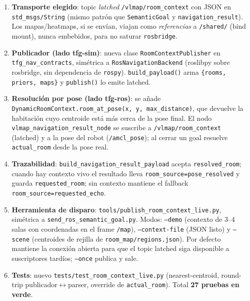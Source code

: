 \documentclass[11pt,a4paper]{article}
\begin{document}
\begin{enumerate}
  \item \textbf{Transporte elegido}: topic \emph{latched}
        \texttt{/vlmap/room\_context} con JSON en \texttt{std\_msgs/String}
        (mismo patrón que \texttt{SemanticGoal} y \texttt{navigation\_result}).
        Los mapas/heatmaps, si se envían, viajan como \emph{referencias} a
        \texttt{/shared/} (bind mount), nunca embebidos, para no saturar
        \texttt{rosbridge}.
  \item \textbf{Publicador (lado tfg-sim)}: nueva clase
        \texttt{RoomContextPublisher} en \texttt{tfg\_nav\_contracts}, simétrica
        a \texttt{RosNavigationBackend} (roslibpy sobre rosbridge, sin
        dependencia de \texttt{rospy}). \texttt{build\_payload()} arma
        \texttt{\{rooms, priors, maps\}} y \texttt{publish()} lo emite latched.
  \item \textbf{Resolución por pose (lado tfg-ros)}: se añade
        \texttt{DynamicRoomContext.room\_at\_pose(x, y, max\_distance)}, que
        devuelve la habitación cuyo centroide está más cerca de la pose final.
        El nodo \texttt{vlmap\_navigation\_result\_node} se suscribe a
        \texttt{/vlmap/room\_context} (latched) y a la pose del robot
        (\texttt{/amcl\_pose}); al cerrar un goal resuelve
        \texttt{actual\_room} desde la pose real.
  \item \textbf{Trazabilidad}: \texttt{build\_navigation\_result\_payload}
        acepta \texttt{resolved\_room}; cuando hay contexto vivo el resultado
        lleva \texttt{room\_source=pose\_resolved} y guarda
        \texttt{requested\_room}; sin contexto mantiene el fallback
        \texttt{room\_source=requested\_echo}.
  \item \textbf{Herramienta de disparo}: \texttt{tools/publish\_room\_context\_live.py},
        simétrica a \texttt{send\_ros\_semantic\_goal.py}. Modos: \texttt{--demo}
        (contexto de 3--4 salas con coordenadas en el frame \texttt{/map}),
        \texttt{--context-file} (JSON listo) y \texttt{--scene} (centroides de
        rejilla de \texttt{room\_map/regions.json}). Por defecto mantiene la
        conexión abierta para que el topic latched siga disponible a
        suscriptores tardíos; \texttt{--once} publica y sale.
  \item \textbf{Tests}: nuevo \texttt{tests/test\_room\_context\_live.py}
        (nearest-centroid, round-trip publicador$\leftrightarrow$parser,
        override de \texttt{actual\_room}). Total \textbf{27 pruebas en verde}.
\end{enumerate}
\end{document}
